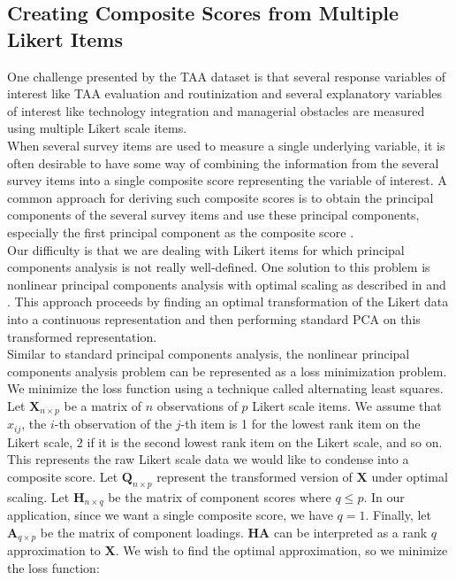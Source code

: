 \documentclass[12pt]{article}
\begin{document}
\subsection{Creating Composite Scores from Multiple Likert Items} \label{sec:likert}

One challenge presented by the TAA dataset is that several response variables of interest like TAA evaluation and routinization and several explanatory variables of interest like technology integration and managerial obstacles are measured using multiple Likert scale items. \\

When several survey items are used to measure a single underlying variable, it is often desirable to have some way of combining the information from the several survey items into a single composite score representing the variable of interest. A common approach for deriving such composite scores is to obtain the principal components of the several survey items and use these principal components, especially the first principal component as the composite score \cite{henderson1990use}\cite{motallebzadeh2007neurocognitive}.\\

Our difficulty is that we are dealing with Likert items for which principal components analysis is not really well-defined. One solution to this problem is nonlinear principal components analysis with optimal scaling as described in \cite{linting2007nonlinear} and \cite{de2011multivariate}. This approach proceeds by finding an optimal transformation of the Likert data into a continuous representation and then performing standard PCA on this transformed representation. \\

Similar to standard principal components analysis, the nonlinear principal components analysis problem can be represented as a loss minimization problem. We minimize the loss function using a technique called alternating least squares. \\

Let $\textbf{X}_{n\times p}$ be a matrix of $n$ observations of $p$ Likert scale items. We assume that $x_{ij}$, the $i$-th observation of the $j$-th item is 1 for the lowest rank item on the Likert scale, 2 if it is the second lowest rank item on the Likert scale, and so on. This represents the raw Likert scale data we would like to condense into a composite score. Let $\textbf{Q}_{n \times p}$ represent the transformed version of $\textbf{X}$ under optimal scaling. Let $\textbf{H}_{n \times q}$ be the matrix of component scores where $q \leq p$. In our application, since we want a single composite score, we have $q=1$. Finally, let $\textbf{A}_{q \times p}$ be the matrix of component loadings. $\textbf{H}\textbf{A}$ can be interpreted as a rank $q$ approximation to $\textbf{X}$. We wish to find the optimal approximation, so we minimize the loss function:
\end{document}
